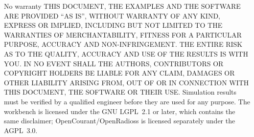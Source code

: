 \documentclass[11pt,a4paper]{article}
\begin{document}
\begin{notice}{No warranty}
THIS DOCUMENT, THE EXAMPLES AND THE SOFTWARE ARE PROVIDED ``AS IS'', WITHOUT WARRANTY OF ANY KIND,
EXPRESS OR IMPLIED, INCLUDING BUT NOT LIMITED TO THE WARRANTIES OF MERCHANTABILITY, FITNESS FOR A
PARTICULAR PURPOSE, ACCURACY AND NON-INFRINGEMENT. THE ENTIRE RISK AS TO THE QUALITY, ACCURACY
AND USE OF THE RESULTS IS WITH YOU. IN NO EVENT SHALL THE AUTHORS, CONTRIBUTORS OR COPYRIGHT
HOLDERS BE LIABLE FOR ANY CLAIM, DAMAGES OR OTHER LIABILITY ARISING FROM, OUT OF OR IN CONNECTION
WITH THIS DOCUMENT, THE SOFTWARE OR THEIR USE. Simulation results must be verified by a qualified
engineer before they are used for any purpose. The workbench is licensed under the GNU LGPL~2.1 or
later, which contains the same disclaimer; OpenCourant/OpenRadioss is licensed separately under
the AGPL~3.0.
\end{notice}
\end{document}
